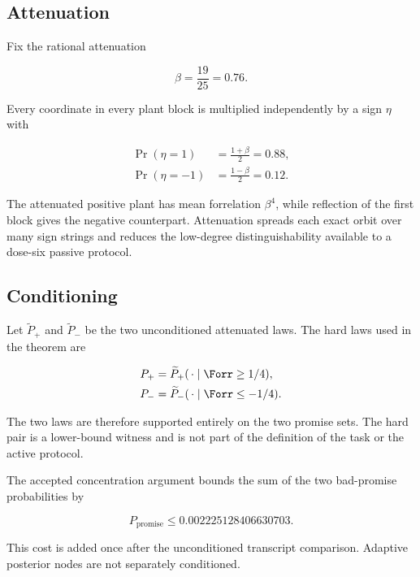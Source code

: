 \subsection{Attenuation}

Fix the rational attenuation

\begin{equation}
\beta=\frac{19}{25}=0.76.
\end{equation}

Every coordinate in every plant block is multiplied independently by a sign $\eta$ with

\begin{align}
\Pr(\eta=1)&=\frac{1+\beta}{2}=0.88,
\\
\Pr(\eta=-1)&=\frac{1-\beta}{2}=0.12.
\label{eq:hard-attenuation}
\end{align}

The attenuated positive plant has mean forrelation $\beta^4$, while reflection of the first block gives the negative counterpart. Attenuation spreads each exact orbit over many sign strings and reduces the low-degree distinguishability available to a dose-six passive protocol.

\subsection{Conditioning}

Let $\widetilde P_+$ and $\widetilde P_-$ be the two unconditioned attenuated laws. The hard laws used in the theorem are

\begin{align}
P_+&=\widetilde P_+(\,\cdot\mid \Forr\ge1/4),
\\
P_-&=\widetilde P_-(\,\cdot\mid \Forr\le-1/4).
\label{eq:hard-conditioned}
\end{align}

The two laws are therefore supported entirely on the two promise sets. The hard pair is a lower-bound witness and is not part of the definition of the task or the active protocol.

The accepted concentration argument bounds the sum of the two bad-promise probabilities by

\begin{equation}
P_{\mathrm{promise}}
\le 0.002225128406630703.
\label{eq:hard-promise}
\end{equation}

This cost is added once after the unconditioned transcript comparison. Adaptive posterior nodes are not separately conditioned.
